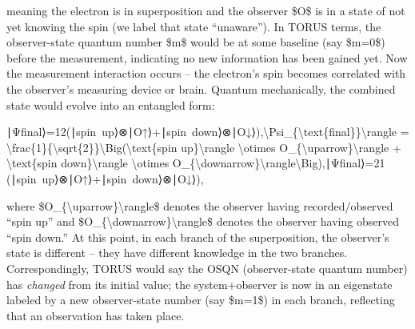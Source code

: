 meaning the electron is in superposition and the observer \$O\$ is in a
state of not yet knowing the spin (we label that state ``unaware'')​. In
TORUS terms, the observer-state quantum number \$m\$ would be at some
baseline (say \$m=0\$) before the measurement, indicating no new
information has been gained yet​. Now the measurement interaction occurs
-- the electron's spin becomes correlated with the observer's measuring
device or brain. Quantum mechanically, the combined state would evolve
into an entangled form:

∣Ψfinal⟩=12(∣spin~up⟩⊗∣O↑⟩+∣spin~down⟩⊗∣O↓⟩),\textbar{}\textbackslash{}Psi\_\{\textbackslash{}text\{final\}\}\textbackslash{}rangle
=
\textbackslash{}frac\{1\}\{\textbackslash{}sqrt\{2\}\}\textbackslash{}Big(\textbar{}\textbackslash{}text\{spin
up\}\textbackslash{}rangle \textbackslash{}otimes
\textbar{}O\_\{\textbackslash{}uparrow\}\textbackslash{}rangle +
\textbar{}\textbackslash{}text\{spin down\}\textbackslash{}rangle
\textbackslash{}otimes
\textbar{}O\_\{\textbackslash{}downarrow\}\textbackslash{}rangle\textbackslash{}Big),∣Ψfinal​⟩=2​1​(∣spin~up⟩⊗∣O↑​⟩+∣spin~down⟩⊗∣O↓​⟩),

where \$\textbar{}O\_\{\textbackslash{}uparrow\}\textbackslash{}rangle\$
denotes the observer having recorded/observed ``spin up'' and
\$\textbar{}O\_\{\textbackslash{}downarrow\}\textbackslash{}rangle\$
denotes the observer having observed ``spin down.'' At this point, in
each branch of the superposition, the observer's state is different --
they have different knowledge in the two branches​. Correspondingly,
TORUS would say the OSQN (observer-state quantum number) has
\emph{changed} from its initial value; the system+observer is now in an
eigenstate labeled by a new observer-state number (say \$m=1\$) in each
branch, reflecting that an observation has taken place​.

